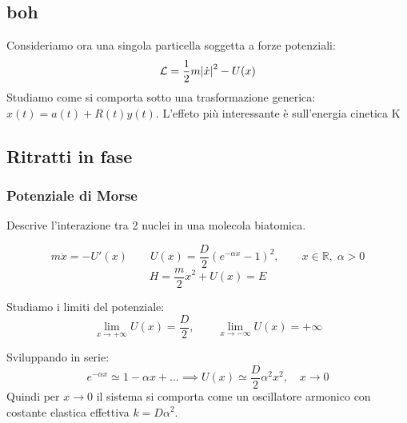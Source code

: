 \subsection{boh}

Consideriamo ora una singola particella soggetta a forze potenziali:
\begin{equation}
    \mathcal{L}= \frac{1}{2}m\abs{\dot{x}}^2 - U (x)
\end{equation}
Studiamo come si comporta sotto una trasformazione generica: $x(t)= a(t)+ R(t)y(t)$.
L'effeto più interessante è sull'energia cinetica K



\subsection{Ritratti in fase}

\subsubsection{Potenziale di Morse}
Descrive l'interazione tra 2 nuclei in una molecola biatomica.

\begin{equation}
    m\ddot{x} = -U'(x)
    \qquad
    U(x) = \frac{D}{2}\left( e^{-\alpha x} - 1 \right)^2, \qquad x \in \mathbb{R}, \; \alpha > 0
\end{equation}
\begin{equation}
    H = \frac{m}{2}\dot{x}^2 + U(x) = E
\end{equation}

Studiamo i limiti del potenziale:
\begin{equation}
    \lim_{x \to +\infty} U(x) = \frac{D}{2}, \qquad \lim_{x \to -\infty} U(x) = +\infty
\end{equation}

Sviluppando in serie:
\begin{equation}
    e^{-\alpha x} \simeq 1 - \alpha x + \dots \implies 
    U(x) \simeq \frac{D}{2}\alpha^2 x^2, \quad x \to 0
\end{equation}
Quindi per $x \to 0$ il sistema si comporta come un oscillatore armonico con costante elastica effettiva $k = D\alpha^2$.

